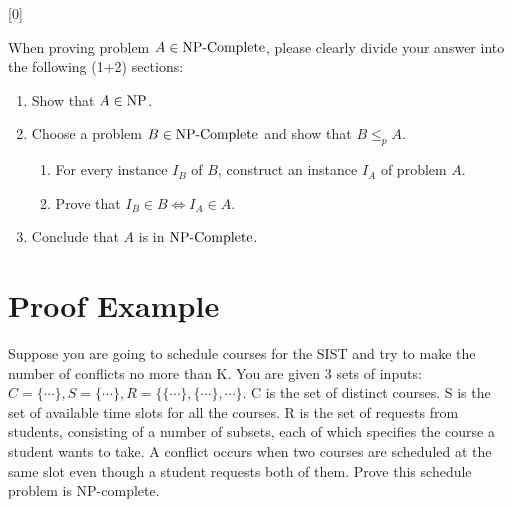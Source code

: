 
[0]

When proving problem $A\in \mathbf{\operatorname{NP-Complete}}$, please clearly divide your answer into the following (1+2) sections:
\begin{enumerate}
	\item Show that $A\in \mathbf{\operatorname{NP}}$.
	\item Choose a problem $B\in \mathbf{\operatorname{NP-Complete}}$ and show that $B\leq_p A$.
	      \begin{enumerate}
		      \item For every instance $I_B$ of $B$, construct an instance $I_A$ of problem $A$.
		      \item Prove that $I_B\in B\iff I_A\in A$.
	      \end{enumerate}
	\item Conclude that $A$ is in $\mathbf{\operatorname{NP-Complete}}$.
\end{enumerate}

\section*{Proof Example}
Suppose you are going to schedule courses for the SIST and try to make the number of conflicts no more than K. You are given 3 sets of inputs: $C=\{\cdots\},S=\{\cdots\},R=\{\{\cdots\},\{\cdots\},\cdots\}$. C is the set of distinct courses. S is the set of available time slots for all the courses. R is the set of requests from students, consisting of a number of subsets, each of which specifies the course a student wants to take. A conflict occurs when two courses are scheduled at the same slot even though a student requests both of them. Prove this schedule problem is NP-complete.\\

